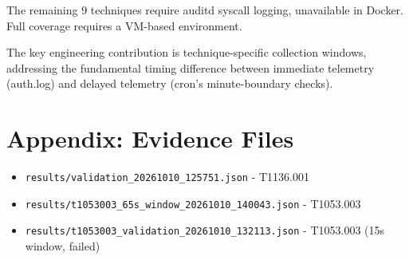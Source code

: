 \documentclass[11pt,a4paper]{article}
\begin{document}
The remaining 9 techniques require auditd syscall logging, unavailable in Docker. Full coverage requires a VM-based environment.

The key engineering contribution is technique-specific collection windows, addressing the fundamental timing difference between immediate telemetry (auth.log) and delayed telemetry (cron's minute-boundary checks).

\section*{Appendix: Evidence Files}

\begin{itemize}
    \item \texttt{results/validation\_20261010\_125751.json} - T1136.001
    \item \texttt{results/t1053003\_65s\_window\_20261010\_140043.json} - T1053.003
    \item \texttt{results/t1053003\_validation\_20261010\_132113.json} - T1053.003 (15s window, failed)
\end{itemize}
\end{document}
